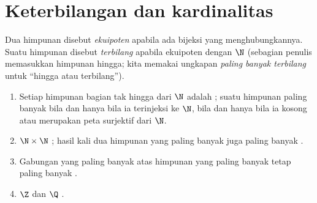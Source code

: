 \section{Keterbilangan dan kardinalitas}

\begin{definition}\label{def:b2:structures:countable}
Dua himpunan disebut \emph{ekuipoten} apabila ada
bijeksi yang menghubungkannya. Suatu himpunan disebut
\emph{terbilang} apabila ekuipoten dengan $\N$
(sebagian penulis memasukkan himpunan hingga; kita memakai ungkapan
\emph{paling banyak terbilang} untuk ``hingga atau terbilang'').
\end{definition}

\begin{proposition}\label{prop:b2:structures:countablestable}
\begin{enumerate}
  \item Setiap himpunan bagian tak hingga dari $\N$ adalah ;
        suatu himpunan paling banyak  bila dan hanya bila ia
        terinjeksi ke $\N$, bila dan hanya bila ia kosong atau
        merupakan peta surjektif dari $\N$.
  \item $\N \times \N$ ; hasil kali dua himpunan yang paling
        banyak  juga paling banyak .
  \item Gabungan yang paling banyak  atas himpunan yang paling
        banyak  tetap paling banyak .
  \item $\Z$ dan $\Q$ .
\end{enumerate}
\end{proposition}

